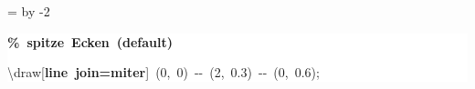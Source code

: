 \begingroup
\ttfamily
{}
=\textwidth
\advance{} by -2\fboxsep
\noindent
\colorbox{background}
{%
\parbox{\dimen255}
{%
\rule[-0.5ex]{0pt}{2.5ex}\hspace*{0.0em}\textcolor{G}{\textbf{\%~spitze~Ecken~(default)}}\\
\rule[-0.5ex]{0pt}{2.5ex}\hspace*{0.0em}\textbackslash{}draw[\textcolor{R}{\textbf{line~join=miter}}]~(0,~0)~{-}{-}~(2,~0.3)~{-}{-}~(0,~0.6);}%
}%
\endgroup
